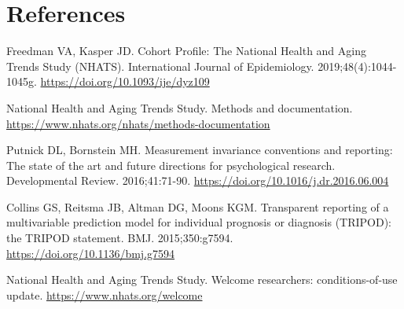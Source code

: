 \documentclass[11pt,a4paper]{article}
\begin{document}
\section*{References}
\begin{list}{}{\setlength{\leftmargin}{2em}\setlength{\itemindent}{-2em}\setlength{\itemsep}{0.3\baselineskip}}\small
\item [1] Freedman VA, Kasper JD. Cohort Profile: The National Health and Aging Trends Study (NHATS). International Journal of Epidemiology. 2019;48(4):1044-1045g. \url{https://doi.org/10.1093/ije/dyz109}
\item [2] National Health and Aging Trends Study. Methods and documentation. \url{https://www.nhats.org/nhats/methods-documentation}
\item [3] Putnick DL, Bornstein MH. Measurement invariance conventions and reporting: The state of the art and future directions for psychological research. Developmental Review. 2016;41:71-90. \url{https://doi.org/10.1016/j.dr.2016.06.004}
\item [4] Collins GS, Reitsma JB, Altman DG, Moons KGM. Transparent reporting of a multivariable prediction model for individual prognosis or diagnosis (TRIPOD): the TRIPOD statement. BMJ. 2015;350:g7594. \url{https://doi.org/10.1136/bmj.g7594}
\item [5] National Health and Aging Trends Study. Welcome researchers: conditions-of-use update. \url{https://www.nhats.org/welcome}
\end{list}
\end{document}
